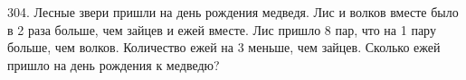 304. Лесные звери пришли на день рождения медведя. Лис и волков вместе было в 2 раза больше, чем зайцев и ежей вместе. Лис пришло 8 пар, что на 1 пару больше, чем волков. Количество ежей на 3 меньше, чем зайцев. Сколько ежей пришло на день рождения к медведю?\\
